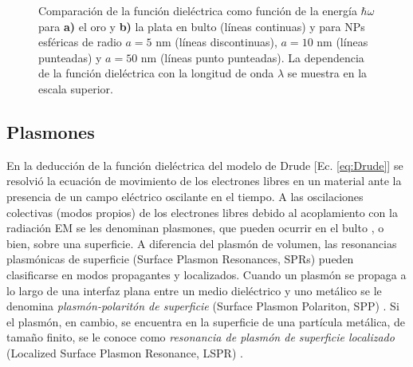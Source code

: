 \begin{figure}[h!]
\begin{subfigure}{.7\linewidth}
	\end{subfigure}\vspace*{-.7em}
	\caption{ Comparación de la función dieléctrica como función de la energía $\hbar\omega$ para \textbf{a)} el   oro y \textbf{b)} la plata en bulto (líneas continuas) y para NPs esféricas de radio $a=5$ nm (líneas discontinuas), $a=10$ nm (líneas punteadas) y $a=50$ nm (líneas punto punteadas). La dependencia de la función dieléctrica con la longitud de onda $\lambda$ se muestra en la escala superior.}\label{fig:sizeCorrection}
	\end{figure}	

\subsection{Plasmones}

En la deducción de la función dieléctrica del modelo de Drude [Ec. \eqref{eq:Drude}] se resolvió la ecuación de movimiento de los electrones libres en un material ante la  presencia de un campo eléctrico oscilante en el tiempo. A las oscilaciones colectivas (modos propios) de los electrones libres debido al acoplamiento con la radiación EM se les denominan  plasmones, que pueden ocurrir en el bulto \cite{stockman2011nanoplasmonics}, o bien, sobre una superficie. A diferencia del plasmón de volumen, las resonancias plasmónicas de superficie (Surface Plasmon Resonances, SPRs) pueden clasificarse en modos propagantes y localizados. Cuando un plasmón se propaga a lo largo de una interfaz plana entre un medio diel\'ectrico y uno met\'alico se le denomina  \emph{plasm\'on-polarit\'on de superficie} (Surface Plasmon Polariton, SPP) \cite{maier2007plasmonics}.  Si el plasmón, en cambio, se encuentra en la superficie de una partícula  met\'alica, de tamaño finito, se le conoce como \emph{resonancia de plasm\'on de superficie localizado} (Localized Surface Plasmon Resonance, LSPR) \cite{maier2007plasmonics}. 


